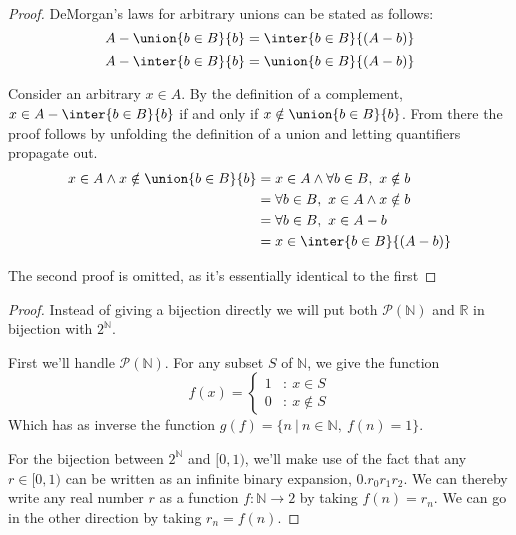\begin{questions}

\begin{solution}
\begin{proof}
  DeMorgan's laws for arbitrary unions can be stated as follows:
  \[ A - \union{b \in B}{b} = \inter{b \in B}{(A - b)} \]
  \[ A - \inter{b \in B}{b} = \union{b \in B}{(A - b)} \]

  Consider an arbitrary $x \in A$. By the definition of a complement, $x \in A - \inter{b \in B}{b}$ if and only if $x \notin \union{b \in B}{b}$. From there the proof follows by unfolding the definition of a union and letting quantifiers propagate out.
  \begin{align*}
    x \in A \wedge x \notin \union{b \in B}{b}
    &= x \in A \wedge \forall b \in B,\ x \notin b \\
    &= \forall b \in B,\ x \in A \wedge x \notin b \\
    &= \forall b \in B,\ x \in A - b \\
    &= x \in \inter{b \in B}{(A - b)} \qedhere
  \end{align*}

  The second proof is omitted, as it's essentially identical to the first
\end{proof}
\end{solution}


\begin{solution}
\begin{proof}
  Instead of giving a bijection directly we will put both $\mathcal{P}(\mathbb{N})$ and $\mathbb{R}$ in bijection with $2^{\mathbb{N}}$.

  First we'll handle $\mathcal{P}(\mathbb{N})$. For any subset $S$ of $\mathbb{N}$, we give the function
  \[ f(x) = \begin{cases}
    1 & :\ x \in S \\
    0 & :\ x \notin S
  \end{cases} \]
  Which has as inverse the function $g(f) = \{ n\ |\ n \in \mathbb{N}, \ f(n) = 1 \}$.

  For the bijection between $2^{\mathbb{N}}$ and $[0,1)$, we'll make use of the fact that any $r \in [0,1)$ can be written as an infinite binary expansion, $0.r_0r_1r_2$. We can thereby write any real number $r$ as a function $f : \mathbb{N} \to 2$ by taking $f(n) = r_n$. We can go in the other direction by taking $r_n = f(n)$.
\end{proof}
\end{solution}
\end{questions}